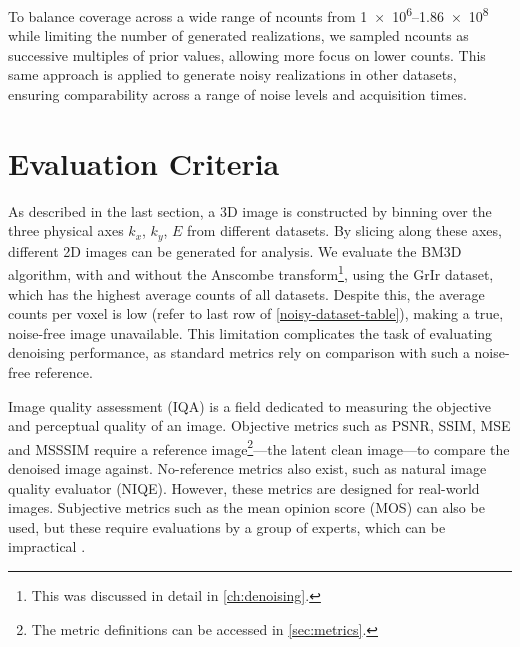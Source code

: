To balance coverage across a wide range of \gls{ncounts} from \numrange{1e6}{1.86e8} while limiting the number of generated realizations, we sampled \gls{ncounts} as successive multiples of prior values, allowing more focus on lower counts. This same approach is applied to generate noisy realizations in other datasets, ensuring comparability across a range of noise levels and acquisition times.

\section{Evaluation Criteria}
As described in the last section, a 3D image is constructed by binning over the three physical axes $k_x$, $k_y$, $E$ from different datasets. By slicing along these axes, different 2D images can be generated for analysis. We evaluate the \gls{BM3D} algorithm, with and without the Anscombe transform\footnote{This was discussed in detail in \cref{ch:denoising}.}, using the \gls{GrIr} dataset, which has the highest average counts of all datasets. Despite this, the average counts per voxel  is low (refer to last row of \cref{noisy-dataset-table}), making a true, noise-free image unavailable. This limitation complicates the task of evaluating denoising performance, as standard metrics rely on comparison with such a noise-free reference.

Image quality assessment (IQA) is a field dedicated to measuring the objective and perceptual  quality of an image. Objective metrics such as \gls{PSNR}, \gls{SSIM}, \gls{MSE} and \gls{MSSSIM} require a reference image\footnote{The metric definitions can be accessed in \cref{sec:metrics}.}---the latent clean image---to compare the denoised image against. No-reference metrics also exist, such as natural image quality evaluator (NIQE). However, these metrics are designed for real-world images. Subjective metrics such as the mean opinion score (MOS) can also be used, but these require evaluations by a group of experts, which can be impractical \cite{eskiciogluImageQualityMeasures1995,linzhangFSIMFeatureSimilarity2011}.

